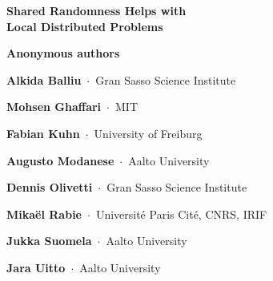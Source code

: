 \documentclass[11pt]{article}
\newenvironment{mycover}{\list{}{\listparindent 0pt
        \itemindent    \listparindent
        \leftmargin    1cm
        \rightmargin   1cm
        \parsep        0pt}\raggedright
    \item\relax}{\endlist}
\newcommand{\myaff}[1]{\,$\cdot$\, {\small #1}\par\smallskip}
\begin{document}
\begin{mycover}
{\huge\bfseries Shared Randomness Helps with \\ Local Distributed Problems \par}
\bigskip
\bigskip

\ifanon
\textbf{Anonymous authors}
\else

\textbf{Alkida Balliu}
\myaff{Gran Sasso Science Institute}

\textbf{Mohsen Ghaffari}
\myaff{MIT}

\textbf{Fabian Kuhn}
\myaff{University of Freiburg}

\textbf{Augusto Modanese}
\myaff{Aalto University}

\textbf{Dennis Olivetti}
\myaff{Gran Sasso Science Institute}

\textbf{Mikaël Rabie}
\myaff{Université Paris Cité, CNRS, IRIF}

\textbf{Jukka Suomela}
\myaff{Aalto University}

\textbf{Jara Uitto}
\myaff{Aalto University}
\fi 

\bigskip
\end{mycover}
\end{document}
